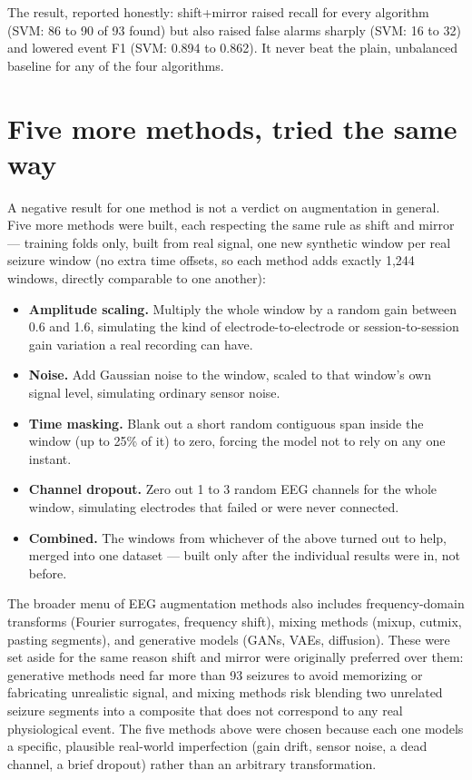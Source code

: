 The result, reported honestly: shift+mirror raised recall for every algorithm (SVM: 86 to 90 of
93 found) but also raised false alarms sharply (SVM: 16 to 32) and lowered event F1 (SVM: 0.894
to 0.862). It never beat the plain, unbalanced baseline for any of the four algorithms.

\section{Five more methods, tried the same way}

A negative result for one method is not a verdict on augmentation in general. Five more
methods were built, each respecting the same rule as shift and mirror --- training folds only,
built from real signal, one new synthetic window per real seizure window (no extra time
offsets, so each method adds exactly 1{,}244 windows, directly comparable to one another):

\begin{itemize}[leftmargin=1.4em]
  \item \textbf{Amplitude scaling.} Multiply the whole window by a random gain between 0.6 and
    1.6, simulating the kind of electrode-to-electrode or session-to-session gain variation a
    real recording can have.
  \item \textbf{Noise.} Add Gaussian noise to the window, scaled to that window's own signal
    level, simulating ordinary sensor noise.
  \item \textbf{Time masking.} Blank out a short random contiguous span inside the window (up to
    25\% of it) to zero, forcing the model not to rely on any one instant.
  \item \textbf{Channel dropout.} Zero out 1 to 3 random EEG channels for the whole window,
    simulating electrodes that failed or were never connected.
  \item \textbf{Combined.} The windows from whichever of the above turned out to help, merged
    into one dataset --- built only after the individual results were in, not before.
\end{itemize}

The broader menu of EEG augmentation methods also includes frequency-domain transforms (Fourier
surrogates, frequency shift), mixing methods (mixup, cutmix, pasting segments), and generative
models (GANs, VAEs, diffusion). These were set aside for the same reason shift and mirror were
originally preferred over them: generative methods need far more than 93 seizures to avoid
memorizing or fabricating unrealistic signal, and mixing methods risk blending two unrelated
seizure segments into a composite that does not correspond to any real physiological event. The
five methods above were chosen because each one models a specific, plausible real-world
imperfection (gain drift, sensor noise, a dead channel, a brief dropout) rather than an
arbitrary transformation.

